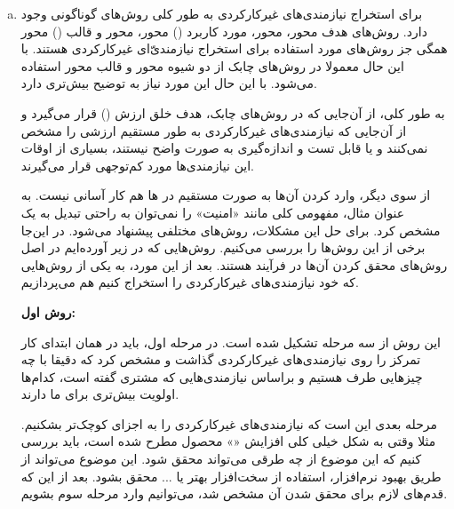 {\begin{enumerate}[a)]
\begin{itemize}
\begin{itemize}
		\end{itemize}
	\end{itemize}
	
	با توجه به همه این موارد، می‌توان تا حد خوبی به \textbf{اهمیت نیازمندی‌های غیرکارکردی در سامانه‌های نرم‌افزاری} پی برد. از‌ آن‌جایی که کیفیت یکی از مهم‌ترین -و شاید مهم‌ترین-  اصل در تولید نرم‌افزار است و نیازمندی‌های غیرکارکردی دقیقا بر روی کیفیت محصول نظارت دارند، توجه به آن‌ها اهمیتی ویژه‌ای در سامانه‌های نرم‌افزاری دارد. این نیازمندی‌ها ناظر بر «چگونگی» کارکرد سیستم هستند و میزان «خوب بودن» آن را مشخص می‌کنند؛ در عین حال مشخص کردن آن‌ها معمولا برای مشتری یا ذی‌نفعان دشوار است. در نتیجه توجه به آن‌ها در سامانه‌های نرم‌افزاری اهمیت بالایی دارد.
	
	\item 
	
	برای استخراج نیازمندی‌های غیرکارکردی به طور کلی روش‌های گوناگونی وجود دارد. روش‌های هدف محور،  محور، مورد کاربرد () محور،  محور و قالب () محور همگی جز روش‌های مورد استفاده برای استخراج نیازمندی‌ّای غیرکارکردی هستند. با این حال معمولا در روش‌های چابک از دو شیوه  محور و قالب محور استفاده می‌شود. با این حال این مورد نیاز به توضیح بیش‌تری دارد. \cite{elicit}
	
	به طور کلی، از آن‌جایی که در روش‌های چابک، هدف خلق ارزش () قرار می‌گیرد و از آن‌جایی که نیازمندی‌های غیرکارکردی به طور مستقیم ارزشی را مشخص نمی‌کنند و یا قابل تست و اندازه‌گیری به صورت واضح نیستند، بسیاری از اوقات این نیازمندی‌ها مورد کم‌توجهی قرار می‌گیرند. \cite{Teamly}
	
	از سوی دیگر، وارد کردن آن‌ها به صورت مستقیم در  ها هم کار آسانی نیست. به عنوان مثال، مفهومی کلی مانند «امنیت» را نمی‌توان به راحتی تبدیل به یک  مشخص کرد. برای حل این مشکلات، روش‌های مختلفی پیشنهاد می‌شود. در این‌جا برخی از این روش‌ها را بررسی می‌کنیم. روش‌هایی که در زیر آورده‌ایم در اصل روش‌های محقق کردن آن‌ها در فرآیند هستند. بعد از این مورد، به یکی از روش‌هایی که خود نیازمندی‌های غیرکارکردی را استخراج کنیم هم می‌پردازیم.
	
	\textbf{روش اول:}
	
	این روش از سه مرحله تشکیل شده است. در مرحله اول، باید در همان ابتدای کار تمرکز را روی نیازمندی‌های غیرکارکردی گذاشت و مشخص کرد که دقیقا با چه چیزهایی طرف هستیم و براساس نیازمندی‌هایی که مشتری گفته است، کدام‌ها اولویت بیش‌تری برای ما دارند.
	
	مرحله بعدی این است که نیازمندی‌های غیرکارکردی را به اجزای کوچک‌تر بشکنیم. مثلا وقتی به شکل خیلی کلی افزایش «» محصول مطرح شده است، باید بررسی کنیم که این موضوع از چه طرقی می‌تواند محقق شود. این موضوع می‌تواند از طریق بهبود نرم‌افزار، استفاده از سخت‌افزار بهتر یا ... محقق بشود. بعد از این که قدم‌های لازم برای محقق شدن آن مشخص شد، می‌توانیم وارد مرحله سوم بشویم.
	

\end{enumerate}}
